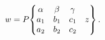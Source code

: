 \[w=\mathop{P\/}\nolimits\!\begin{Bmatrix}\alpha&\beta&\gamma&\\
a_{1}&b_{1}&c_{1}&z\\
a_{2}&b_{2}&c_{2}&\end{Bmatrix}.\]